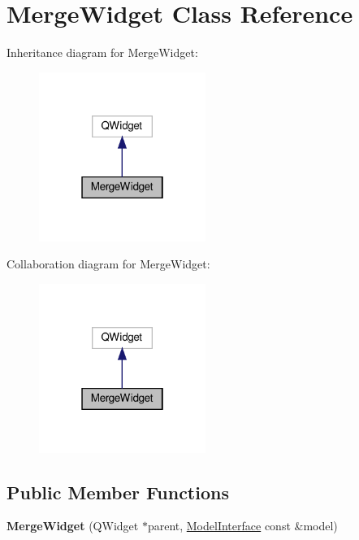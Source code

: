 \hypertarget{classMergeWidget}{}\section{Merge\+Widget Class Reference}
\label{classMergeWidget}


Inheritance diagram for Merge\+Widget\+:
\nopagebreak
\begin{figure}[H]
\begin{center}
\leavevmode
\includegraphics[width=154pt]{classMergeWidget__inherit__graph}
\end{center}
\end{figure}


Collaboration diagram for Merge\+Widget\+:
\nopagebreak
\begin{figure}[H]
\begin{center}
\leavevmode
\includegraphics[width=154pt]{classMergeWidget__coll__graph}
\end{center}
\end{figure}
\subsection*{Public Member Functions}
\begin{DoxyCompactItemize}
\item 
\mbox{\label{classMergeWidget_a4974b0fd859f7e6b91a5839d8245901b}} 
{\bfseries Merge\+Widget} (Q\+Widget $\ast$parent, \hyperlink{classModelInterface}{Model\+Interface} const \&model)
\end{DoxyCompactItemize}


